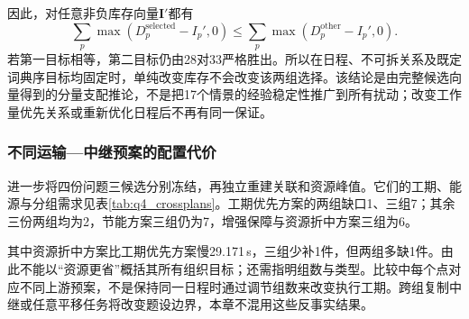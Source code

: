因此，对任意非负库存向量$\boldsymbol I'$都有
\begin{equation}
 \sum_p\max(D_p^{\mathrm{selected}}-I_p',0)
 \le\sum_p\max(D_p^{\mathrm{other}}-I_p',0).
\label{eq:q4_inventory_dominance}
\end{equation}
若第一目标相等，第二目标仍由28对33严格胜出。所以在日程、不可拆关系及既定词典序目标均固定时，单纯改变库存不会改变该两组选择。该结论是由完整候选向量得到的分量支配推论，不是把17个情景的经验稳定性推广到所有扰动；改变工作量优先关系或重新优化日程后不再有同一保证。

\subsubsection{不同运输—中继预案的配置代价}
进一步将四份问题三候选分别冻结，再独立重建关联和资源峰值。它们的工期、能源与分组需求见表\ref{tab:q4_crossplans}。工期优先方案的两组缺口1、三组7；其余三份两组均为2，节能方案三组仍为7，增强保障与资源折中方案三组为6。


其中资源折中方案比工期优先方案慢29.171\,s，三组少补1件，但两组多缺1件。由此不能以“资源更省”概括其所有组织目标；还需指明组数与类型。比较中每个点对应不同上游预案，不是保持同一日程时通过调节组数来改变执行工期。跨组复制中继或任意平移任务将改变题设边界，本章不混用这些反事实结果。


